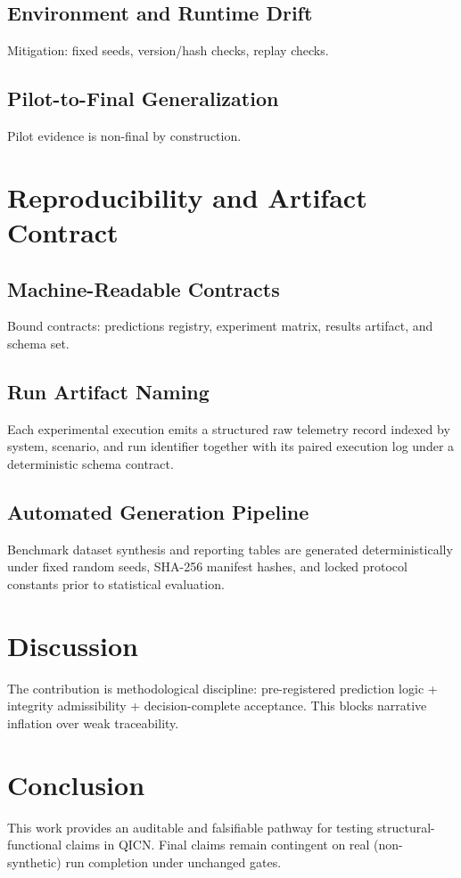 \documentclass[11pt,a4paper]{article}
\theoremstyle{definition}
\begin{document}
\subsection{Environment and Runtime Drift}
Mitigation: fixed seeds, version/hash checks, replay checks.

\subsection{Pilot-to-Final Generalization}
Pilot evidence is non-final by construction.

\section{Reproducibility and Artifact Contract}
\subsection{Machine-Readable Contracts}
Bound contracts: predictions registry, experiment matrix, results artifact, and schema set.

\subsection{Run Artifact Naming}
Each experimental execution emits a structured raw telemetry record indexed by system, scenario, and run identifier together with its paired execution log under a deterministic schema contract.

\subsection{Automated Generation Pipeline}
Benchmark dataset synthesis and reporting tables are generated deterministically under fixed random seeds, SHA-256 manifest hashes, and locked protocol constants prior to statistical evaluation.

\section{Discussion}
The contribution is methodological discipline: pre-registered prediction logic + integrity admissibility + decision-complete acceptance. This blocks narrative inflation over weak traceability.

\section{Conclusion}
This work provides an auditable and falsifiable pathway for testing structural-functional claims in QICN. Final claims remain contingent on real (non-synthetic) run completion under unchanged gates.
\end{document}
